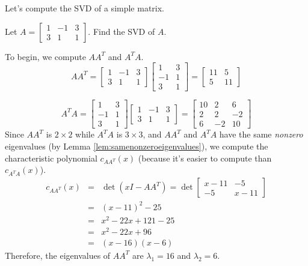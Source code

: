 \documentclass{ximera}
\begin{document}
Let's compute the SVD of a simple matrix.

\begin{example}\label{ex:SVD2x3}
Let
$A=\left[\begin{array}{rrr} 1 & -1 & 3 \\ 3 & 1 & 1 \end{array}\right]$.
Find the SVD of $A$.

\begin{explanation}
To begin, we compute $AA^T$ and $A^TA$.
\[ AA^T = \left[\begin{array}{rrr} 1 & -1 & 3 \\ 3 & 1 & 1 \end{array}\right]
\left[\begin{array}{rr} 1 & 3 \\ -1 & 1 \\ 3 & 1  \end{array}\right]
= \left[\begin{array}{rr} 11 & 5 \\ 5 & 11  \end{array}\right]\]

\[ A^TA = \left[\begin{array}{rr} 1 & 3 \\ -1 & 1 \\ 3 & 1  \end{array}\right]
\left[\begin{array}{rrr} 1 & -1 & 3 \\ 3 & 1 & 1 \end{array}\right]
= \left[\begin{array}{rrr} 10 & 2 & 6 \\ 2 & 2 & -2\\
6 & -2 & 10 \end{array}\right]\]
Since $AA^T$ is $2\times 2$ while $A^T A$ is $3\times 3$, and $AA^T$
and $A^TA$ have the same {\em nonzero} eigenvalues (by Lemma
\ref{lem:samenonzeroeigenvalues}), we compute the characteristic polynomial  $c_{AA^T}(x)$ (because it's
easier to compute than $c_{A^TA}(x)$).
\begin{eqnarray*}
c_{AA^T}(x)& = &\det(xI-AA^T)=  \det \left[\begin{array}{cc}
x-11 & -5 \\ -5 & x-11 \end{array}\right]\\
& = &(x-11)^2 - 25 \\
& = & x^2-22x+121-25\\
& = & x^2-22x+96\\
& = & (x-16)(x-6)
\end{eqnarray*}
Therefore, the eigenvalues of $AA^T$ are $\lambda_1=16$ and $\lambda_2=6$.


\end{explanation}
\end{example}
\end{document}
